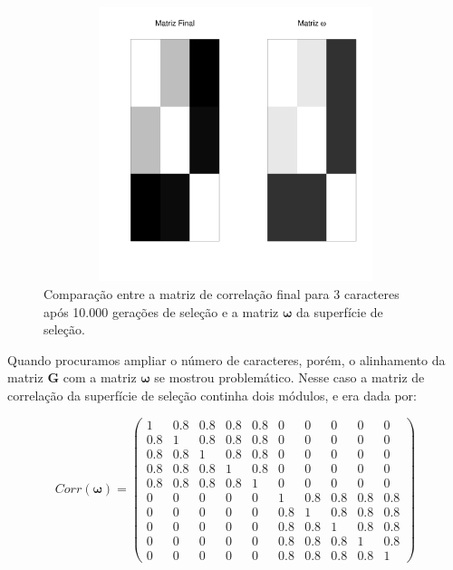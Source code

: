\begin{figure}[tb]
    \centering
    \includegraphics[width=150mm, height=80mm]{figuras/Mat3tracos}
    \caption{Comparação entre a matriz de correlação final para 3
        caracteres após 10.000 gerações de seleção e a matriz
        $\pmb{\omega}$ da superfície de seleção.}
    \label{MatJones3tracos}
\end{figure}

Quando procuramos ampliar o número de caracteres, porém, o alinhamento da
matriz $\mathbf{G}$ com a matriz $\pmb{\omega}$ se mostrou problemático.
Nesse caso a matriz de correlação da superfície de seleção continha dois
módulos, e era dada por:


\begin{equation}
    Corr(\pmb{\omega}) = \left( 
    \begin{smallmatrix} 
        1 & 0.8 & 0.8 & 0.8 & 0.8 & 0 & 0 & 0 & 0 & 0\\  
      0.8 & 1 & 0.8 & 0.8 & 0.8 & 0 & 0 & 0 & 0 & 0\\  
      0.8 & 0.8 & 1 & 0.8 & 0.8 & 0 & 0 & 0 & 0 & 0\\  
      0.8 & 0.8 & 0.8 & 1 & 0.8 & 0 & 0 & 0 & 0 & 0\\  
      0.8 & 0.8 & 0.8 & 0.8 & 1 & 0 & 0 & 0 & 0 & 0\\  
        0 & 0 & 0 & 0 & 0 & 1 & 0.8 & 0.8 & 0.8 & 0.8\\ 
        0 & 0 & 0 & 0 & 0 & 0.8 & 1 & 0.8 & 0.8 & 0.8\\
        0 & 0 & 0 & 0 & 0 & 0.8 & 0.8 & 1 & 0.8 & 0.8\\
        0 & 0 & 0 & 0 & 0 & 0.8 & 0.8 & 0.8 & 1 & 0.8\\
        0 & 0 & 0 & 0 & 0 & 0.8 & 0.8 & 0.8 & 0.8 & 1
    \end{smallmatrix}  \right)
    \label{matw}
\end{equation}

